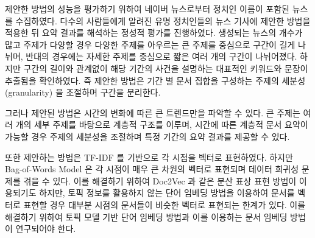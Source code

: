 \documentclass[oneside, ko,phd]{snuthesis_utf8_kor}
\begin{document}
제안한 방법의 성능을 평가하기 위하여 네이버 뉴스로부터 정치인 이름이 포함된 뉴스를 수집하였다.
다수의 사람들에게 알려진 유명 정치인들의 뉴스 기사에 제안한 방법을 적용한 뒤 요약 결과를 해석하는 정성적 평가를 진행하였다.
생성되는 뉴스의 개수가 많고 주제가 다양할 경우 다양한 주제를 아우르는 큰 주제를 중심으로 구간이 길게 나뉘며, 반대의 경우에는 자세한 주제를 중심으로 짧은 여러 개의 구간이 나뉘어졌다.
하지만 구간의 길이와 관계없이 해당 기간의 사건을 설명하는 대표적인 키워드와 문장이 추출됨을 확인하였다.
즉 제안한 방법은 기간 별 문서 집합을 구성하는 주제의 세분성 (granularity) 을 조절하며 구간을 분리한다.

그러나 제안된 방법은 시간의 변화에 따른 큰 트렌드만을 파악할 수 있다.
큰 주제는 여러 개의 세부 주제를 바탕으로 계층적 구조를 이루며, 시간에 따른 계층적 문서 요약이 가능할 경우 주제의 세분성을 조절하며 특정 기간의 요약 결과를 제공할 수 있다.

또한 제안하는 방법은 TF-IDF 를 기반으로 각 시점을 벡터로 표현하였다.
하지만 Bag-of-Words Model 은 각 시점이 매우 큰 차원의 벡터로 표현되며 데이터 희귀성 문제를 겪을 수 있다.
이를 해결하기 위하여 Doc2Vec 과 같은 분산 표상 표현 방법이 이용되기도 하지만, 토픽 정보를 활용하지 않는 단어 임베딩 방법을 이용하여 문서를 벡터로 표현할 경우 대부분 시점의 문서들이 비슷한 벡터로 표현되는 한계가 있다.
이를 해결하기 위하여 토픽 모델 기반 단어 임베딩 방법과 이를 이용하는 문서 임베딩 방법이 연구되어야 한다.

\newpage
\end{document}
